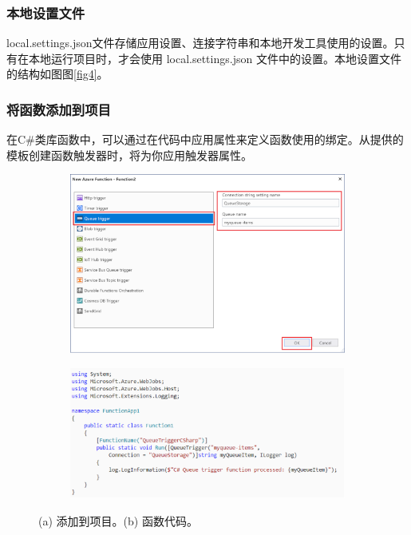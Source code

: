 \documentclass[11pt]{article}
\begin{document}
\subsubsection{本地设置文件} 
local.settings.json文件存储应用设置、连接字符串和本地开发工具使用的设置。只有在本地运行项目时，才会使用 local.settings.json 文件中的设置。本地设置文件的结构如图图\ref{fig4}。

\subsubsection{将函数添加到项目} 
在C\#类库函数中，可以通过在代码中应用属性来定义函数使用的绑定。从提供的模板创建函数触发器时，将为你应用触发器属性。	
\begin{figure}[!htbp]
	\begin{subfigure}[b]{0.5\linewidth}
		\includegraphics[width=\linewidth]{figs/5.png}
		\caption{}
		\label{fig5}
	\end{subfigure}
	\begin{subfigure}[b]{0.5\linewidth}
		\includegraphics[width=\linewidth]{figs/6.png}
		\caption{}
		\label{fig6}
	\end{subfigure}
	\caption{(a) 添加到项目。(b) 函数代码。}
\end{figure}
\end{document}
